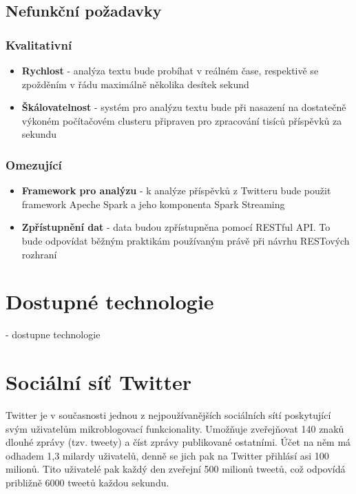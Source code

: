 \documentclass[thesis=B,czech]{FITthesis}[2012/06/26]
\begin{document}
\subsection{Nefunkční požadavky}
\subsubsection{Kvalitativní}
\begin{itemize}
\item \textbf{Rychlost} - analýza textu bude probíhat v reálném čase, respektivě se zpožděním v řádu maximálně několika desítek sekund
\item \textbf{Škálovatelnost} - systém pro analýzu textu bude při nasazení na dostatečně výkoném počítačovém clusteru připraven pro zpracování tisíců příspěvků za sekundu
\end{itemize}
\subsubsection{Omezující}
\begin{itemize}
\item \textbf{Framework pro analýzu} - k analýze příspěvků z Twitteru bude použit framework Apeche Spark a jeho komponenta Spark Streaming
\item \textbf{Zpřístupnění dat} - data budou zpřístupněna pomocí RESTful API. To bude odpovídat běžným praktikám používaným právě při návrhu RESTových rozhraní
\end{itemize}

\section{Dostupné technologie}
	- dostupne technologie

\section{Sociální síť Twitter}
\label{twitter-api}
	
	Twitter je v současnosti jednou z nejpoužívanějších sociálních sítí poskytující svým uživatelům mikroblogovací funkcionality. Umožňuje zveřejňovat 140 znaků dlouhé zprávy (tzv. tweety) a číst zprávy publikované ostatními. Účet na něm má odhadem 1,3 milardy uživatelů, denně se jich pak na Twitter přihlásí asi 100 milionů\cite{twitter-stats}. Tito uživatelé pak každý den zveřejní 500 milionů tweetů, což odpovídá približně 6000 tweetů každou sekundu\cite{twitter-stats-2}. 
\end{document}
